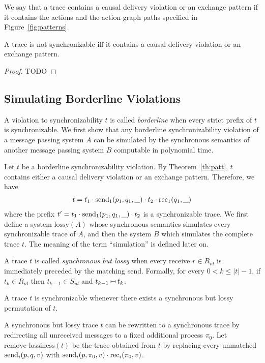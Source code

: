We say that a trace contains a causal delivery violation or an exchange pattern if it contains the actions and the action-graph paths
specified in Figure~\ref{fig:patterns}.

\begin{theorem}\label{th:patt}
A trace is not synchronizable if{f} it contains a causal delivery violation or an exchange pattern.
\end{theorem}
\begin{proof}
TODO
\end{proof}

\subsection{Simulating Borderline Violations}

A violation to synchronizability $t$ is called \emph{borderline} when every strict prefix of $t$ is synchronizable.
We first show that any borderline synchronizability violation of a message passing system $A$ can be simulated by 
the synchronous semantics of another message passing system $B$ computable in polynomial time.

Let $t$ be a borderline synchronizability violation.
By Theorem~\ref{th:patt}, $t$ contains either a causal delivery violation or an exchange pattern.
Therefore, we have 
\begin{align*}
t=t_1\cdot \mathrm{send}_{1}({p_1,q_1,\_}) \cdot t_2\cdot \mathrm{rec}_{1}({q_1,\_})
\end{align*} 
where the prefix $t' = t_1\cdot \mathrm{send}_{1}({p_1,q_1,\_}) \cdot t_2$ is a synchronizable trace.
We first define a system $\mathrm{lossy}(A)$ whose synchronous semantics simulates every synchronizable 
trace of $A$, and then the system $B$ which simulates the complete trace $t$. The meaning of 
the term ``simulation'' is defined later on.

A trace $t$ is called \emph{synchronous but lossy} when every receive $r\in R_{id}$ is immediately 
preceded by the matching send. Formally, for every $0 < k\leq |t| -1$, if $t_k\in R_{id}$ then 
$t_{k-1}\in S_{id}$ and $t_{k-1}\match t_{k}$.

\begin{lemma}
A trace $t$ is synchronizable whenever there exists a synchronous but lossy permutation of $t$.
\end{lemma}

A synchronous but lossy trace $t$ can be rewritten to a synchronous trace by redirecting all unreceived messages 
to a fixed additional process $\pi_0$. Let $\mathrm{remove\text{-}lossiness}(t)$ be the trace obtained from $t$
by replacing every unmatched $\mathrm{send}_{i}({p,q,v})$ with $\mathrm{send}_{i}({p,\pi_0,v})\cdot \mathrm{rec}_{i}({\pi_0,v})$.

